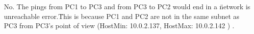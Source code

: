 No. The pings from PC1 to PC3  and from PC3 to PC2 would end in a \"network is unreachable error.\"
This is because PC1 and PC2 are not in the same subnet as PC3 from PC3's point of view (HostMin:   10.0.2.137, HostMax:   10.0.2.142 ) .